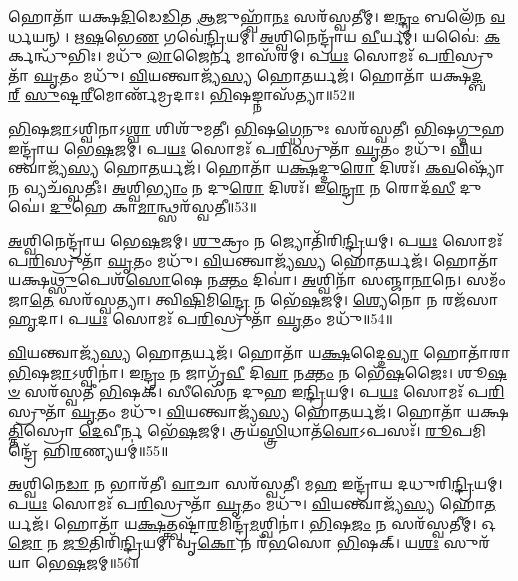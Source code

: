 𑌹𑍋𑌤𑌾᳴ 𑌯𑌕𑍍𑌷\-\ul{𑌦𑌿}\-𑌡𑍇\-\ul{𑌡𑌿}\-𑌤 \ul{𑌆}\-𑌜𑍁𑌹𑍍𑌵𑌾᳴\-\ul{𑌨𑌃} 𑌸𑌰᳴𑌸𑍍𑌵𑌤𑍀𑌮𑍍।
𑌇\-\ul{𑌨𑍍𑌦𑍍𑌰𑌂} 𑌬𑌲𑍇᳴𑌨 \ul{𑌵}\-𑌰𑍍𑌧𑌯𑌨𑍍।
\-\ul{𑌋}\-\-\ul{𑌷}\-𑌭𑍇\-\ul{𑌣} 𑌗𑌵𑍇॑\-\ul{𑌨𑍍𑌦𑍍𑌰𑌿}\-𑌯𑌮𑍍।
\-\ul{𑌅}\-𑌶𑍍𑌵𑌿𑌨𑍇𑌨𑍍𑌦𑍍𑌰𑌾᳴𑌯 \ul{𑌵𑍀}\-𑌰𑍍𑌯𑌮𑍍॑।
𑌯𑌵𑍈॑: \ul{𑌕}\-𑌰𑍍𑌕𑌨𑍍𑌧𑍁᳴𑌭𑌿𑌃।
𑌮𑌧𑍁᳴ \ul{𑌲𑌾}\-𑌜𑍈𑌰𑍍𑌨 𑌮𑌾𑌸᳴𑌰𑌮𑍍।
𑌪\-\ul{𑌯𑌃} 𑌸𑍋𑌮𑌃᳴ 𑌪\-\ul{𑌰𑌿}\-𑌸𑍍𑌰𑍁𑌤𑌾᳴ \ul{𑌘𑍃}\-𑌤𑌂 𑌮𑌧𑍁᳴।
\-\ul{𑌵𑌿}\-𑌯𑌨𑍍𑌤𑍍𑌵𑌾𑌜𑍍𑌯᳴\-\ul{𑌸𑍍𑌯} 𑌹𑍋\-\ul{𑌤}\-𑌰𑍍𑌯𑌜᳴।
𑌹𑍋𑌤𑌾᳴ 𑌯𑌕𑍍𑌷\-\ul{𑌦𑍍𑌬}\-\-\ul{𑌰𑍍}\-𑌹𑌿𑌃 \ul{𑌸𑍁}\-𑌷𑍍𑌟\-\ul{𑌰𑍀}\-𑌮𑍋𑌰𑍍𑌣᳴𑌮𑍍𑌰𑌦𑌾𑌃।
\-\ul{𑌭𑌿}\-𑌷𑌙𑍍𑌨𑌾𑌸᳴𑌤𑍍𑌯𑌾॥52॥

\-\ul{𑌭𑌿}\-𑌷\-\ul{𑌜𑌾}\-\-𑌽𑌶𑍍𑌵𑌿𑌨𑌾\-𑌽\-\ul{𑌶𑍍𑌵𑌾} 𑌶𑌿𑌶𑍁᳴𑌮𑌤𑍀।
\-\ul{𑌭𑌿}\-𑌷\-\ul{𑌗𑍍𑌧𑍇}\-𑌨𑍁𑌃 𑌸𑌰᳴𑌸𑍍𑌵𑌤𑍀।
\-\ul{𑌭𑌿}\-𑌷\-\ul{𑌗𑍍𑌦𑍁}\-𑌹 𑌇𑌨𑍍𑌦𑍍𑌰𑌾᳴𑌯 𑌭𑍇\-\ul{𑌷}\-𑌜𑌮𑍍।
𑌪\-\ul{𑌯𑌃} 𑌸𑍋𑌮𑌃᳴ 𑌪\-\ul{𑌰𑌿}\-𑌸𑍍𑌰𑍁𑌤𑌾᳴ \ul{𑌘𑍃}\-𑌤𑌂 𑌮𑌧𑍁᳴।
\-\ul{𑌵𑌿}\-𑌯𑌨𑍍𑌤𑍍𑌵𑌾𑌜𑍍𑌯᳴\-\ul{𑌸𑍍𑌯} 𑌹𑍋\-\ul{𑌤}\-𑌰𑍍𑌯𑌜᳴।
𑌹𑍋𑌤𑌾᳴ 𑌯\-\ul{𑌕𑍍𑌷}\-𑌦𑍍𑌦𑍁\-\ul{𑌰𑍋} 𑌦𑌿𑌶𑌃᳴।
\-\ul{𑌕}\-\-\ul{𑌵}\-𑌷𑍍𑌯𑍋᳴ 𑌨 𑌵𑍍𑌯𑌚᳴𑌸𑍍𑌵𑌤𑍀𑌃।
\-\ul{𑌅}\-𑌶𑍍𑌵𑌿\-\ul{𑌭𑍍𑌯𑌾𑌂} 𑌨 𑌦𑍁\-\ul{𑌰𑍋} 𑌦𑌿𑌶𑌃᳴।
𑌇\-\ul{𑌨𑍍𑌦𑍍𑌰𑍋} 𑌨 𑌰𑍋𑌦᳴\-\ul{𑌸𑍀} 𑌦𑍁𑌘𑍇॑।
\-\ul{𑌦𑍁}\-𑌹𑍇 𑌕𑌾\-\ul{𑌮𑌾}\-𑌨𑍍𑌥𑍍𑌸𑌰᳴𑌸𑍍𑌵𑌤𑍀॥53॥

\-\ul{𑌅}\-𑌶𑍍𑌵𑌿𑌨𑍇𑌨𑍍𑌦𑍍𑌰𑌾᳴𑌯 𑌭𑍇\-\ul{𑌷}\-𑌜𑌮𑍍।
\-\ul{𑌶𑍁}\-𑌕𑍍𑌰𑌂 𑌨 𑌜𑍍𑌯𑍋𑌤𑌿᳴𑌰𑌿\-\ul{𑌨𑍍𑌦𑍍𑌰𑌿}\-𑌯𑌮𑍍।
𑌪\-\ul{𑌯𑌃} 𑌸𑍋𑌮𑌃᳴ 𑌪\-\ul{𑌰𑌿}\-𑌸𑍍𑌰𑍁𑌤𑌾᳴ \ul{𑌘𑍃}\-𑌤𑌂 𑌮𑌧𑍁᳴।
\-\ul{𑌵𑌿}\-𑌯𑌨𑍍𑌤𑍍𑌵𑌾𑌜𑍍𑌯᳴\-\ul{𑌸𑍍𑌯} 𑌹𑍋\-\ul{𑌤}\-𑌰𑍍𑌯𑌜᳴।
𑌹𑍋𑌤𑌾᳴ 𑌯𑌕𑍍𑌷\-\ul{𑌥𑍍𑌸𑍁}\-𑌪𑍇𑌶᳴\-\ul{𑌸𑍋}\-𑌷𑍇 𑌨\-\ul{𑌕𑍍𑌤𑌂} 𑌦𑌿𑌵𑌾॑।
\-\ul{𑌅}\-𑌶𑍍𑌵𑌿𑌨𑌾᳴ 𑌸𑌞𑍍𑌜𑌾\-\ul{𑌨𑌾}\-𑌨𑍇।
𑌸𑌮𑌂᳴ 𑌜𑌾\-\ul{𑌤𑍇} 𑌸𑌰᳴𑌸𑍍𑌵𑌤𑍍𑌯𑌾।
𑌤𑍍𑌵𑌿\-\ul{𑌷𑌿}\-𑌮𑌿\-\ul{𑌨𑍍𑌦𑍍𑌰𑍇} 𑌨 𑌭𑍇᳴\-\ul{𑌷}\-𑌜𑌮𑍍।
\-\ul{𑌶𑍍𑌯𑍇}\-𑌨𑍋 𑌨 𑌰𑌜᳴𑌸𑌾 \ul{𑌹𑍃}\-𑌦𑌾।
𑌪\-\ul{𑌯𑌃} 𑌸𑍋𑌮𑌃᳴ 𑌪\-\ul{𑌰𑌿}\-𑌸𑍍𑌰𑍁𑌤𑌾᳴ \ul{𑌘𑍃}\-𑌤𑌂 𑌮𑌧𑍁᳴॥54॥

\-\ul{𑌵𑌿}\-𑌯𑌨𑍍𑌤𑍍𑌵𑌾𑌜𑍍𑌯᳴\-\ul{𑌸𑍍𑌯} 𑌹𑍋\-\ul{𑌤}\-𑌰𑍍𑌯𑌜᳴।
𑌹𑍋𑌤𑌾᳴ 𑌯\-\ul{𑌕𑍍𑌷}\-𑌦𑍍𑌦𑍈\-\ul{𑌵𑍍𑌯𑌾} 𑌹𑍋𑌤𑌾᳴𑌰𑌾 \ul{𑌭𑌿}\-𑌷\-\ul{𑌜𑌾}\-\-𑌽𑌶𑍍𑌵𑌿𑌨𑌾॑।
𑌇\-\ul{𑌨𑍍𑌦𑍍𑌰𑌂} 𑌨 𑌜𑌾𑌗𑍃᳴\-\ul{𑌵𑍀} 𑌦𑌿\-\ul{𑌵𑌾} 𑌨\-\ul{𑌕𑍍𑌤𑌂} 𑌨 𑌭𑍇᳴\-\ul{𑌷}\-𑌜𑍈𑌃।
𑌶𑍂\-\ul{𑌷}\-\-\ul{𑍞} 𑌸𑌰᳴𑌸𑍍𑌵𑌤𑍀 \ul{𑌭𑌿}\-𑌷𑌕𑍍।
𑌸𑍀𑌸𑍇᳴𑌨 𑌦𑍁𑌹 𑌇\-\ul{𑌨𑍍𑌦𑍍𑌰𑌿}\-𑌯𑌮𑍍।
𑌪\-\ul{𑌯𑌃} 𑌸𑍋𑌮𑌃᳴ 𑌪\-\ul{𑌰𑌿}\-𑌸𑍍𑌰𑍁𑌤𑌾᳴ \ul{𑌘𑍃}\-𑌤𑌂 𑌮𑌧𑍁᳴।
\-\ul{𑌵𑌿}\-𑌯𑌨𑍍𑌤𑍍𑌵𑌾𑌜𑍍𑌯᳴\-\ul{𑌸𑍍𑌯} 𑌹𑍋\-\ul{𑌤}\-𑌰𑍍𑌯𑌜᳴।
𑌹𑍋𑌤𑌾᳴ 𑌯𑌕𑍍𑌷\-\ul{𑌤𑍍𑌤𑌿}\-𑌸𑍍𑌰𑍋 \ul{𑌦𑍇}\-𑌵𑍀𑌰𑍍𑌨 𑌭𑍇᳴\-\ul{𑌷}\-𑌜𑌮𑍍।
𑌤𑍍𑌰𑌯᳴\-\ul{𑌸𑍍𑌤𑍍𑌰𑌿}\-𑌧𑌾𑌤᳴\-\ul{𑌵𑍋}\-\-𑌽𑌪𑌸𑌃᳴।
\-\ul{𑌰𑍂}\-𑌪𑌮𑌿𑌨𑍍𑌦𑍍𑌰𑍇᳴ 𑌹𑌿\-\ul{𑌰}\-𑌣𑍍𑌯𑌯𑌮𑍍॑॥55॥

\-\ul{𑌅}\-𑌶𑍍𑌵𑌿𑌨𑍇\-\ul{𑌡𑌾} 𑌨 𑌭𑌾𑌰᳴𑌤𑍀।
\-\ul{𑌵𑌾}\-𑌚𑌾 𑌸𑌰᳴𑌸𑍍𑌵𑌤𑍀।
𑌮\-\ul{𑌹} 𑌇𑌨𑍍𑌦𑍍𑌰𑌾᳴𑌯 𑌦𑌧𑍁𑌰𑌿\-\ul{𑌨𑍍𑌦𑍍𑌰𑌿}\-𑌯𑌮𑍍।
𑌪\-\ul{𑌯𑌃} 𑌸𑍋𑌮𑌃᳴ 𑌪\-\ul{𑌰𑌿}\-𑌸𑍍𑌰𑍁𑌤𑌾᳴ \ul{𑌘𑍃}\-𑌤𑌂 𑌮𑌧𑍁᳴।
\-\ul{𑌵𑌿}\-𑌯𑌨𑍍𑌤𑍍𑌵𑌾𑌜𑍍𑌯᳴\-\ul{𑌸𑍍𑌯} 𑌹𑍋\-\ul{𑌤}\-𑌰𑍍𑌯𑌜᳴।
𑌹𑍋𑌤𑌾᳴ 𑌯\-\ul{𑌕𑍍𑌷}\-𑌤𑍍𑌤𑍍𑌵𑌷𑍍𑌟𑌾᳴\-\ul{𑌰}\-𑌮𑌿𑌨𑍍𑌦𑍍𑌰᳴\-\ul{𑌮}\-𑌶𑍍𑌵𑌿𑌨𑌾॑।
\-\ul{𑌭𑌿}\-𑌷\-\ul{𑌜𑌂} 𑌨 𑌸𑌰᳴𑌸𑍍𑌵𑌤𑍀𑌮𑍍।
𑌓\-\ul{𑌜𑍋} 𑌨 \ul{𑌜𑍂}\-𑌤𑌿𑌰𑌿᳴\-\ul{𑌨𑍍𑌦𑍍𑌰𑌿}\-𑌯𑌮𑍍।
𑌵𑍃\-\ul{𑌕𑍋} 𑌨 𑌰᳴\-\ul{𑌭}\-𑌸𑍋 \ul{𑌭𑌿}\-𑌷𑌕𑍍।
𑌯\-\ul{𑌶𑌃} 𑌸𑍁𑌰᳴𑌯𑌾 𑌭𑍇\-\ul{𑌷}\-𑌜𑌮𑍍॥56॥

